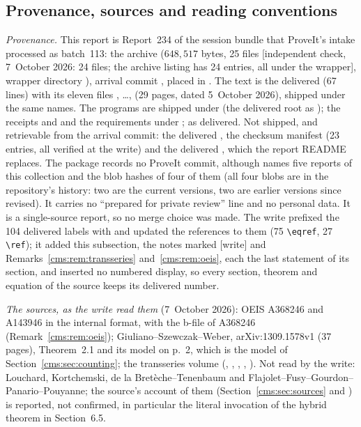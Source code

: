 \subsection{Provenance, sources and reading conventions}\label{cms:sec:provenance}
\begin{writenote}\raggedright
\emph{Provenance.} This report is Report~234 of the session bundle that
ProveIt's  intake processed as batch~113: the archive
 ($648{,}517$ bytes, 25 files [independent check,
7~October 2026: 24 files; the archive listing has 24 entries, all under the
wrapper], wrapper directory
), arrival commit , placed in
. The text is the delivered  (67 lines) with
its eleven \verb|| files , \ldots,
 (29 pages, dated 5~October 2026), shipped
under the same names. The programs are shipped under  (the
delivered root  as ); the receipts
 and  and the
requirements under ;  as delivered. Not shipped,
and retrievable from the arrival commit: the delivered ,
the checksum manifest  (23 entries, all verified at the write) and the delivered
, which the report README replaces. The package records no
ProveIt commit, although  names five reports of this
collection and the blob hashes of four of them (all four blobs are in the
repository's history: two are the current versions, two are earlier versions
since revised). It carries no ``prepared for private review'' line and no
personal data. It is a single-source report, so no merge choice was made. The
write prefixed the 104 delivered labels with  and updated the
references to them (75 \verb|\eqref|, 27 \verb|\ref|); it added this subsection, the notes marked
[write] and Remarks~\ref{cms:rem:transseries} and~\ref{cms:rem:oeis}, each the
last statement of its section, and inserted no numbered display, so every
section, theorem and equation of the source keeps its delivered number.

\emph{The sources, as the write read them} (7~October 2026): OEIS A368246 and
A143946 in the internal format, with the b-file of A368246
(Remark~\ref{cms:rem:oeis}); Giuliano--Szewczak--Weber, arXiv:1309.1578v1 (37
pages), Theorem~2.1 and its model on p.~2, which is the model of
Section~\ref{cms:sec:counting}; the transseries volume
(, , ,
, ). Not read by the write:
Louchard, Kortchemski, de la Bret\`eche--Tenenbaum and
Flajolet--Fusy--Gourdon--Panario--Pouyanne; the source's account of them
(Section~\ref{cms:sec:sources} and ) is reported, not
confirmed, in particular the literal invocation of the hybrid theorem in
Section~6.5.


\end{writenote}
